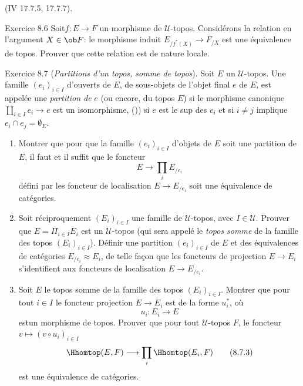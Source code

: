 \noindent (\EGA IV 17.7.5, 17.7.7).

\begin{enonce*}[remark]{Exercice 8.6}
Soit\pageoriginale $f:E\rightarrow F$ un morphisme de
$𝒰$-topos. Considérons la relation en l'argument $X\in \ob
F$: le morphisme induit $E_{/f^{\ast}(X)}\rightarrow F_{/X}$ est une
équivalence de topos. Prouver que cette relation est de nature
locale.
\end{enonce*}

\begin{enonce*}[remark]{Exercice 8.7}
(\emph{Partitions d'un topos, somme de topos}). Soit $E$ un
$𝒰$-topos. Une famille $(e_i)_{i\in I}$ d'ouverts de $E$,
\ie de sous-objets de l'objet final $e$ de $E$, est appelée une
\emph{partition de} $e$ (ou encore, du topos $E$) si le morphisme
canonique $\amalg_{i\in I}e_i\rightarrow e$ est un isomorphisme, \ie
()) si $e$ est le sup des $e_i$ et si $i\neq j$
implique $e_i\cap e_j=∅_E$.
\begin{enumerate}
\renewcommand{\theenumi}{\alph{enumi}}
\renewcommand{\labelenumi}{\theenumi)}
\item Montrer que pour que la famille $(e_i)_{i\in I}$ d'objets de $E$
soit une partition de $E$, il faut et il suffit que le foncteur
\begin{equation*}
E\longrightarrow \prod_i E_{/e_i}\tag{8.7.1}
\end{equation*}
défini par les foncteur de localisation $E\rightarrow E_{/e_i}$ soit
une équivalence de catégories.

\item Soit réciproquement $(E_i)_{i\in I}$ une famille de
$𝒰$-topos, avec $I\in 𝒰$. Prouver que $E=\Pi_{i\in
I} E_i$ est un $𝒰$-topos (qui sera appelé le \emph{topos
somme} de la famille des topos $(E_i)_{i\in I}$). Définir une
partition $(e_i)_{i\in I}$ de $E$ et des équivalences de catégories
$E_{/e_i}\approx E_i$, de telle façon que les foncteurs de
projection $E\rightarrow E_i$ s'identifient aux foncteurs de
localisation $E\rightarrow E_{/e_i}$.

\item Soit $E$ le topos somme de la famille des topos $(E_i)_{i\in
I}$. Montrer que pour tout $i\in I$ le foncteur projection
$E\rightarrow E_i$ est de la forme $u^{\ast}_i$, où
\begin{equation*}
u_i:E_i\longrightarrow E\tag{8.7.2}
\end{equation*}
est\pageoriginale un morphisme de topos. Prouver que pour tout
$𝒰$-topos $F$, le foncteur $v\mapsto (v\circ u_i)_{i\in I}$
\begin{equation*}
\Hhomtop(E,F)\longrightarrow \prod_i\Hhomtop(E_i,F)\tag{8.7.3}
\end{equation*}
est une équivalence de catégories.


\end{enumerate}
\end{enonce*}
